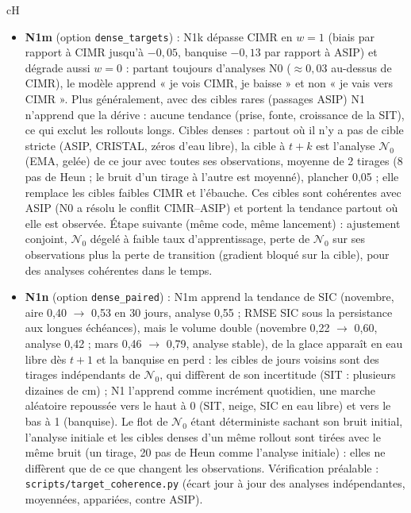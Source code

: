 \documentclass[10pt]{article}
\begin{document}
\begin{bsec}{cH}
\begin{itemize}
\item \textbf{N1m} (option \texttt{dense\_targets}) : N1k dépasse CIMR en $w=1$ (biais par rapport à CIMR jusqu'à $-0{,}05$, banquise $-0{,}13$ par rapport à ASIP) et dégrade aussi $w=0$ : partant toujours d'analyses N0 ($\approx 0{,}03$ au-dessus de CIMR), le modèle apprend « je vois CIMR, je baisse » et non « je vais vers CIMR ». Plus généralement, avec des cibles rares (passages ASIP) N1 n'apprend que la dérive : aucune tendance (prise, fonte, croissance de la SIT), ce qui exclut les rollouts longs. Cibles denses : partout où il n'y a pas de cible stricte (ASIP, CRISTAL, zéros d'eau libre), la cible à $t+k$ est l'analyse $\mathcal N_0$ (EMA, gelée) de ce jour avec toutes ses observations, moyenne de 2 tirages (8 pas de Heun ; le bruit d'un tirage à l'autre est moyenné), plancher 0,05 ; elle remplace les cibles faibles CIMR et l'ébauche. Ces cibles sont cohérentes avec ASIP (N0 a résolu le conflit CIMR--ASIP) et portent la tendance partout où elle est observée. Étape suivante (même code, même lancement) : ajustement conjoint, $\mathcal N_0$ dégelé à faible taux d'apprentissage, perte de $\mathcal N_0$ sur ses observations plus la perte de transition (gradient bloqué sur la cible), pour des analyses cohérentes dans le temps.
\item \textbf{N1n} (option \texttt{dense\_paired}) : N1m apprend la tendance de SIC (novembre, aire 0,40 $\to$ 0,53 en 30 jours, analyse 0,55 ; RMSE SIC sous la persistance aux longues échéances), mais le volume double (novembre 0,22 $\to$ 0,60, analyse 0,42 ; mars 0,46 $\to$ 0,79, analyse stable), de la glace apparaît en eau libre dès $t+1$ et la banquise en perd : les cibles de jours voisins sont des tirages indépendants de $\mathcal N_0$, qui diffèrent de son incertitude (SIT : plusieurs dizaines de cm) ; N1 l'apprend comme incrément quotidien, une marche aléatoire repoussée vers le haut à 0 (SIT, neige, SIC en eau libre) et vers le bas à 1 (banquise). Le flot de $\mathcal N_0$ étant déterministe sachant son bruit initial, l'analyse initiale et les cibles denses d'un même rollout sont tirées avec le même bruit (un tirage, 20 pas de Heun comme l'analyse initiale) : elles ne diffèrent que de ce que changent les observations. Vérification préalable : \texttt{scripts/target\_coherence.py} (écart jour à jour des analyses indépendantes, moyennées, appariées, contre ASIP).

\end{itemize}
\end{bsec}
\end{document}
